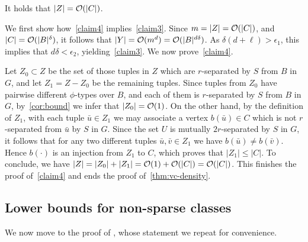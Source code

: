   \begin{claim}\label{claim4}
It holds that $|Z|=\mathcal{O}(|C|)$.
  \end{claim}
  
  We first show how~\cref{claim4} implies~\cref{claim3}.
  Since $m=|Z|=\mathcal{O}(|C|)$,
  and $|C|=\mathcal{O}(|B|^\delta)$,
  it follows that $|Y|=\mathcal{O}(m^d)=\mathcal{O}(|B|^{d\delta})$. As $\delta(d+\ell)>\epsilon_1$, this implies that $d\delta<\epsilon_2$, yielding~\cref{claim3}.
  We now prove~\cref{claim4}.

\medskip
  Let $Z_0\subset Z$ be the set of 
  those tuples in $Z$ which are $r$-separated by $S$ from $B$ in $G$,
  and let $Z_1=Z-Z_0$ be the remaining  tuples.
  Since tuples from $Z_0$ have pairwise different $\phi$-types over $B$, and each of them is $r$-separated by $S$ from $B$ in $G$, by~\cref{cor:bound} we infer that $|Z_0|=\mathcal{O}(1)$.  
 On the other hand, by the definition of $Z_1$, with each tuple $\bar u\in Z_1$ we may associate a vertex $b(\bar u)\in C$ which is not $r$-separated from $\bar u$ by $S$ in $G$.
 Since the set $U$ is mutually $2r$-separated by $S$ in $G$, it follows that for any two different tuples $\bar u,\bar v\in Z_1$ we have $b(\bar u)\neq b(\bar v)$.
 Hence $b(\cdot)$ is an injection from $Z_1$ to $C$, which proves that $|Z_1|\leq |C|$.
 To conclude, we have $|Z|=|Z_0|+|Z_1|=\mathcal{O}(1)+\mathcal{O}(|C|)=\mathcal{O}(|C|)$. This finishes the proof of~\cref{claim4} and ends the proof of~\cref{thm:vc-density}.

  
\subsection{Lower bounds for non-sparse classes}
We now move to the proof of ,
whose statement we repeat for convenience.



\vclower*

